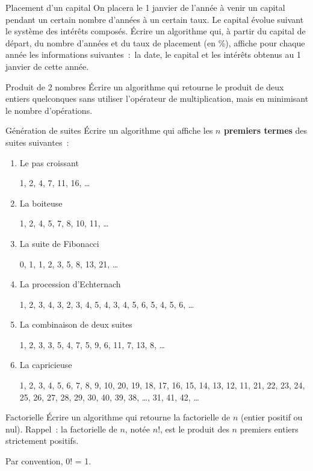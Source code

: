 \begin{Exercice}{Placement d’un capital}
	On placera le 1 janvier de l’année à venir un
	capital pendant un certain nombre d’années à un certain taux. Le
	capital évolue suivant le système des intérêts composés. Écrire un
	algorithme qui, à partir du capital de départ, du nombre d’années et du
	taux de placement (en \%), affiche pour chaque année les informations
	suivantes~:~la date, le capital et les intérêts obtenus au
	1 janvier de cette année.
\end{Exercice}

\bigskip
\begin{Exercice}{Produit de 2 nombres}
	Écrire un algorithme qui retourne le produit de deux entiers quelconques
	sans utiliser l’opérateur de multiplication, mais en minimisant le
	nombre d’opérations.
\end{Exercice}

\begin{Exercice}{Génération de suites}
	Écrire un algorithme qui affiche les \textbf{$n$ premiers termes} des
	suites suivantes~:

	\begin{enumerate}[label=\alph*)]
	\item {Le pas croissant 
	
	1, 2, 4, 7, 11, 16, \dots}
	\item {La boiteuse
	
	1, 2, 4, 5, 7, 8, 10, 11, \dots}
	\item {La suite de Fibonacci
	
	0, 1, 1, 2, 3, 5, 8, 13, 21, \dots }
	\item {La procession d’Echternach
	
	1, 2, 3, 4, 3, 2, 3, 4, 5, 4, 3, 4, 5, 6, 5, 4, 5, 6, \dots}
	\item {La combinaison de deux suites
	
	1, 2, 3, 3, 5, 4, 7, 5, 9, 6, 11, 7, 13, 8, \dots }
	\item {La capricieuse
	
	1, 2, 3, 4, 5, 6, 7, 8, 9, 10, 20, 19, 18, 17, 16, 15, 14, 13, 12, 11,
	21, 22, 23, 24, 25, 26, 27, 28, 29, 30, 40, 39, 38, \dots, 31, 41, 42, \dots}
	\end{enumerate}
\end{Exercice}

\begin{Exercice}{Factorielle}
	Écrire un algorithme qui retourne la factorielle de $n$ (entier positif ou
	nul). Rappel~: la factorielle de $n$, notée $n$!, est le produit des $n$
	premiers entiers strictement positifs. 
	
	Par convention, 0! = 1.
\end{Exercice}

